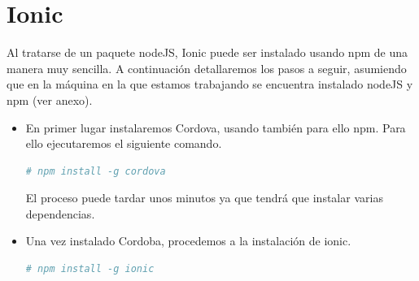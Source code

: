 \chapter{Ionic}\label{ch:ionic}
Al tratarse de un paquete nodeJS, Ionic puede ser instalado usando \gls{npm} de una manera muy sencilla. A continuación detallaremos los pasos a seguir, asumiendo que en la máquina en la que estamos trabajando se encuentra instalado nodeJS y npm (ver anexo).
\begin{itemize}
  \item En primer lugar instalaremos Cordova, usando también para ello \gls{npm}. Para ello ejecutaremos el siguiente comando.
  \begin{lstlisting}[language=bash]
    # npm install -g cordova
  \end{lstlisting}
  El proceso puede tardar unos minutos ya que tendrá que instalar varias dependencias.
  \item Una vez instalado Cordoba, procedemos a la instalación de ionic.
  \begin{lstlisting}[language=bash]
    # npm install -g ionic
  \end{lstlisting}
\end{itemize}


